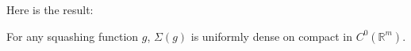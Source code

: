 Here is the result:
\begin{theorem}[Hornik 1989]
For any squashing function $g$, $\Sigma(g)$ is uniformly dense on compact in $C^0(\mathbb{R}^m)$.
\end{theorem}

